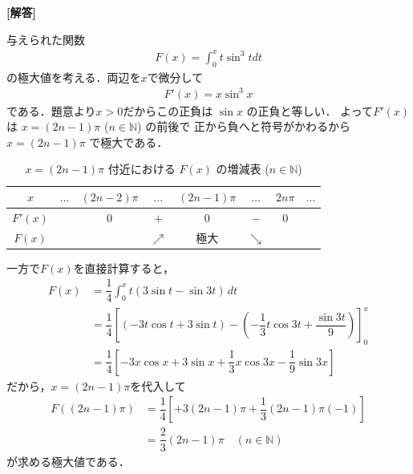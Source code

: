 \documentclass[../../main.tex]{subfiles}
\begin{document}
\begin{oframed}
  
\end{oframed}

{\bf [解答]}

与えられた関数
\begin{align}
  F(x) = \int_{0}^{x} t\sin^3 t dt \label{eq:1}
\end{align}
の極大値を考える．両辺を$x$で微分して
\begin{align}
  F'(x) = x \sin^3 x \label{eq:2}
\end{align}
である．題意より$x>0$だからこの正負は $\sin x$ の正負と等しい．
よって$F'(x)$ は $x = (2n-1)\pi$ ($n \in \mathbb{N}$) の前後で 正から負へと符号がかわるから $x = (2n-1)\pi$ で極大である．

\begin{table}[htb]
  \centering
  \caption{$x = (2n-1)\pi$ 付近における $F(x)$ の増減表 ($n \in \mathbb{N}$)}
  \label{tab:1970_5_variation}
  \renewcommand{\arraystretch}{1.3}
  \begin{tabular}{c|c|c|c|c|c|c|c}
    \hline
    $x$ & $\dots$ & $(2n-2)\pi$ & $\dots$ & $(2n-1)\pi$ & $\dots$ & $2n\pi$ & $\dots$ \\ \hline
    $F'(x)$ & & $0$ & $+$ & $0$ & $-$ & $0$ & \\ \hline
    $F(x)$ & & & $\nearrow$ & 極大 & $\searrow$ & & \\ \hline
  \end{tabular}
\end{table}

一方で$F(x)$を直接計算すると，
\begin{align}
  F(x)
  &= \dfrac{1}{4} \int_0^x t (3\sin t - \sin 3t) \, dt \\
  &= \dfrac{1}{4} \left[ \left( -3t\cos t + 3\sin t \right) - \left( -\dfrac{1}{3}t\cos 3t + \dfrac{\sin 3t}{9} \right) \right]_0^x \\
  &= \dfrac{1}{4} \left[ -3x\cos x + 3\sin x + \dfrac{1}{3}x\cos 3x - \dfrac{1}{9}\sin 3x \right]
\end{align}
だから，$x=(2n-1)\pi$を代入して
\begin{align}
  F((2n-1)\pi) &= \dfrac{1}{4} \left[ +3(2n-1)\pi + \dfrac{1}{3}(2n-1)\pi (-1) \right] \\
  &= \dfrac{2}{3}(2n-1)\pi \quad (n \in \mathbb{N})
\end{align}
が求める極大値である．

\newpage
\end{document}
